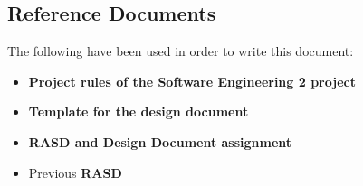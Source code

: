 \subsection{Reference Documents}
The following have been used in order to write this document:
\begin{itemize}
    \item\textbf{Project rules of the Software Engineering 2 project}
    \item\textbf{Template for the design document}
    \item\textbf{RASD and Design Document assignment}
    \item Previous \textbf{RASD}
\end{itemize}


